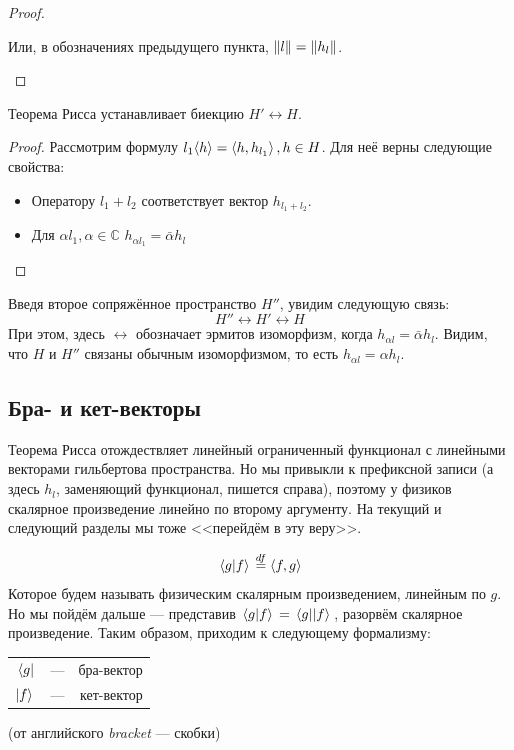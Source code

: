 \documentclass[12pt]{article}
\begin{document}
\begin{proof}
\begin{enumerate}
				Или, в обозначениях предыдущего пункта, $\left\| l \right\| = \left\| h_l \right\|$.
			
			\end{enumerate}
		\end{proof}
	
		\begin{note}
			Теорема Рисса устанавливает биекцию $H' \leftrightarrow H$.
		\end{note}
		\begin{proof}
			Рассмотрим формулу $l_1\langle h \rangle = \left\langle h, h_{l_1} \right\rangle, h \in H$. Для неё верны следующие
			свойства:
			\begin{itemize}
				\item Оператору $l_1 + l_2$ соответствует вектор $h_{l_1+l_2}$.
				\item Для $\alpha l_1, \alpha \in \mathbb{C}$ $h_{\alpha l_1} = \bar{\alpha} h_l$
			\end{itemize}
		\end{proof}
	
		Введя второе сопряжённое пространство $H''$, увидим следующую связь:
		$$H'' \leftrightarrow H' \leftrightarrow H$$
		При этом, здесь $\leftrightarrow$ обозначает эрмитов изоморфизм, когда 
		$h_{\alpha l} = \bar{\alpha} h_l$. %
		Видим, что $H$ и $H''$ связаны обычным изоморфизмом, то есть $h_{\alpha l} = \alpha h_l$.
	
	\subsection{Бра- и кет-векторы}

		Теорема Рисса отождествляет линейный ограниченный функционал с линейными векторами гильбертова пространства.
		Но мы привыкли к префиксной записи (а здесь $h_l$, заменяющий функционал, пишется справа), поэтому у физиков
		скалярное произведение линейно по второму аргументу. На текущий и следующий разделы мы тоже <<перейдём в эту веру>>.
	
		$$\, \langle g | f \rangle \, \overset{df}{=} \left\langle f, g \right\rangle$$
		Которое будем называть физическим скалярным произведением, линейным по $g$. Но мы пойдём дальше --- представив
		$\, \langle g | f \rangle \, = \, \langle g | | f \rangle \,$, разорвём скалярное произведение. Таким образом, приходим к следующему формализму: \\
		\begin{tabular}{l c r}
			$\, \langle g |$ & --- & бра-вектор \\
			$| f \rangle \,$ & --- & кет-вектор \\
		\end{tabular}
		(от английского \textit{bracket} --- скобки)
	
\end{document}
